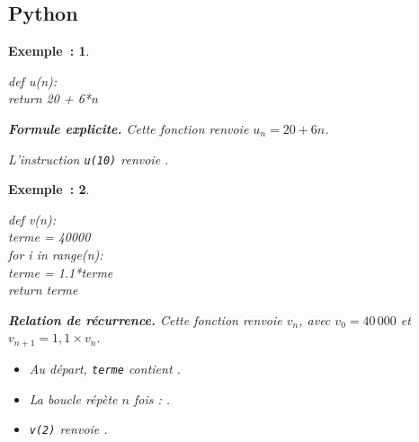 \documentclass[12pt]{article}
\theoremstyle{break}
\newtheorem*{example}{Exemple~:}
\theoremstyle{inline}
\begin{document}
\subsection{Python}

\begin{example}
  \begin{minipage}[c]{0.42\linewidth}
    \begin{python}
      def u(n):\\
      \tab return 20 + 6*n
    \end{python}
  \end{minipage}
  \hfill
  \begin{minipage}[c]{0.55\linewidth}
    \raggedright
    \textbf{Formule explicite.} Cette fonction renvoie $u_n = 20 + 6n$.

    L'instruction \texttt{u(10)} renvoie .
  \end{minipage}
\end{example}

\begin{example}
  \begin{minipage}[c]{0.42\linewidth}
    \begin{python}
      def v(n):\\
      \tab terme = 40000\\
      \tab for i in range(n):\\
      \tab\tab terme = 1.1*terme\\
      \tab return terme
    \end{python}
  \end{minipage}
  \hfill
  \begin{minipage}[c]{0.55\linewidth}
    \raggedright
    \textbf{Relation de récurrence.} Cette fonction renvoie $v_n$, avec $v_0 = 40\,000$ et $v_{n+1} = 1{,}1 \times v_n$.
    \begin{itemize}
      \item Au départ, \texttt{terme} contient .
      \item La boucle répète $n$ fois : .
      \item \texttt{v(2)} renvoie .
    \end{itemize}
  \end{minipage}
\end{example}
\end{document}
